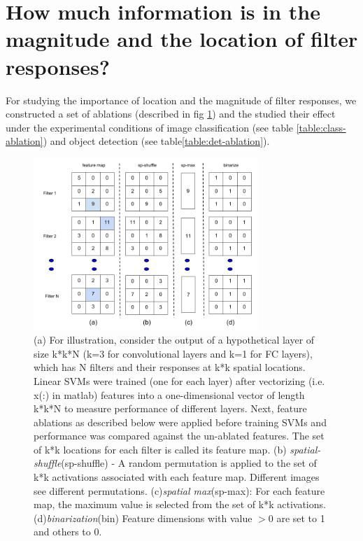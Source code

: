 \section{How much information is in the magnitude and the location of filter responses?}
\label{sec-where-info}
For studying the importance of location and the magnitude of filter responses, we constructed a set of ablations (described in fig \ref{fig:features}) and the studied their effect under the experimental conditions of image classification (see table \ref{table:class-ablation}) and object detection (see table\ref{table:det-ablation}).

\begin{figure}[t!]
\centering
\includegraphics[height=6.5cm]{images/features1.png}
\caption{(a) For illustration, consider the output of a hypothetical layer of size k*k*N (k=3 for convolutional layers and k=1 for FC layers), which has N filters and their responses at k*k spatial locations. Linear SVMs were trained (one for each layer) after vectorizing (i.e. x(:) in matlab) features into a one-dimensional vector of length k*k*N to measure performance of different layers. Next, feature ablations as described below were applied before training SVMs and performance was compared against the un-ablated features. The set of k*k locations for each filter is called its feature map. (b) \textit{spatial-shuffle}(sp-shuffle) -  A random permutation is applied to the set of k*k activations associated with each feature map. Different images see different permutations. (c)\textit{spatial max}(sp-max): For each feature map, the maximum value is selected from the set of k*k activations. (d)\textit{binarization}(bin) Feature dimensions with value $>0$ are set to 1 and others to 0.}
\label{fig:features}
\end{figure}

